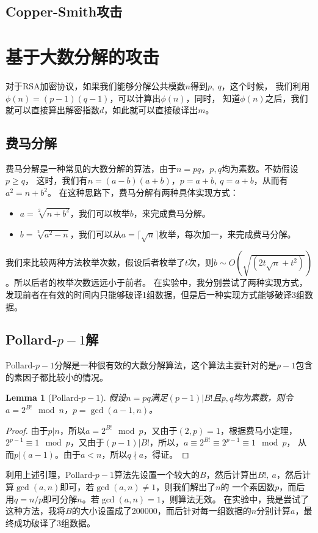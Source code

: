 \documentclass{ctexart}
\newtheorem{lemma}[theorem]{Lemma}
\begin{document}
\subsection{Copper-Smith攻击}


\section{基于大数分解的攻击}
对于RSA加密协议，如果我们能够分解公共模数$n$得到$p,\ q$，这个时候，
我们利用$\phi(n)=(p-1)(q-1)$，可以计算出$\phi(n)$，同时，
知道$\phi(n)$之后，我们就可以直接算出解密指数$d$，如此就可以直接破译出$m$。
\subsection{费马分解}
费马分解是一种常见的大数分解的算法，由于$n=pq$，$p,q$均为素数。不妨假设$p\geqslant q$，
这时，我们有$n=(a-b)(a+b)$，$p=a+b,\ q=a+b$，从而有$a^2=n+b^2$。
在这种思路下，费马分解有两种具体实现方式：
\begin{itemize}
    \item $a=\sqrt[2]{n+b^2}$，我们可以枚举$b$，来完成费马分解。
    \item $b=\sqrt[2]{a^2-n}$，我们可以从$a=\lceil \sqrt{n}\rceil$枚举，每次加一，来完成费马分解。
\end{itemize}
我们来比较两种方法枚举次数，假设后者枚举了$t$次，则$b\sim O(\sqrt{(2t\sqrt{n}+t^2)})$。所以后者的枚举次数远远小于前者。
在实验中，我分别尝试了两种实现方式，发现前者在有效的时间内只能够破译1组数据，但是后一种实现方式能够破译3组数据。
\subsection{Pollard-\texorpdfstring{$p-1$}分解}
Pollard-$p-1$分解是一种很有效的大数分解算法，这个算法主要针对的是$p-1$包含的素因子都比较小的情况。
\begin{lemma}[Pollard-$p-1$]
    假设$n=pq$满足$(p-1)\vert B!$且$p,q$均为素数，则令$a=2^{B!}\mod n$，$p=\gcd(a-1,n)$。
\end{lemma}
\begin{proof}
    由于$p|n$，所以$a=2^{B!}\mod p$，又由于$(2,p)=1$，根据费马小定理，
    $2^{p-1}\equiv 1\mod p$，又由于$(p-1)\vert B!$，所以，$a\equiv 2^{B!}\equiv 2^{p-1}\equiv 1\mod p$，
    从而$p|(a-1)$。由于$a<n$，所以$q \nmid a$，得证。
\end{proof}
利用上述引理，Pollard-$p-1$算法先设置一个较大的$B$，然后计算出$B!,\ a$，然后计算$\gcd(a,n)$即可，若$\gcd(a,n)\neq 1$，则我们解出了$n$的
一个素因数$p$，而后用$q=n/p$即可分解$n$。若$\gcd(a,n)=1$，则算法无效。
在实验中，我是尝试了这种方法，我将$B$的大小设置成了200000，而后针对每一组数据的$n$分别计算$a$，最终成功破译了3组数据。
\end{document}
